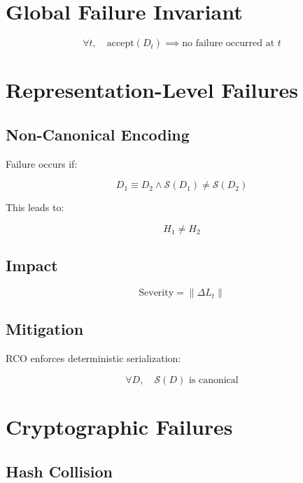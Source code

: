 \section{Global Failure Invariant}

\begin{equation}
\forall t, \quad \text{accept}(D_t) \implies \text{no failure occurred at } t
\end{equation}

\section{Representation-Level Failures}

\subsection{Non-Canonical Encoding}

Failure occurs if:

\begin{equation}
D_1 \equiv D_2 \land \mathcal{S}(D_1) \neq \mathcal{S}(D_2)
\end{equation}

This leads to:

\begin{equation}
H_1 \neq H_2
\end{equation}

\subsection{Impact}

\begin{equation}
\text{Severity} = \|\Delta L_t\|
\end{equation}

\subsection{Mitigation}

RCO enforces deterministic serialization:

\begin{equation}
\forall D, \quad \mathcal{S}(D) \text{ is canonical}
\end{equation}

\section{Cryptographic Failures}

\subsection{Hash Collision}

